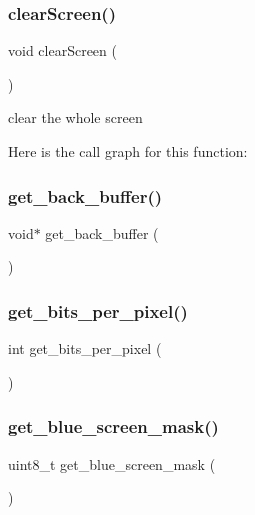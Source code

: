 \subsubsection{\texorpdfstring{clearScreen()}{clearScreen()}}
{\footnotesize\ttfamily void clear\+Screen (\begin{DoxyParamCaption}{ }\end{DoxyParamCaption})}



clear the whole screen 

Here is the call graph for this function\+:
\mbox{\label{group__video_gabf77be88afd0e4b1165719c50c8896ba}} 
\subsubsection{\texorpdfstring{get\_back\_buffer()}{get\_back\_buffer()}}
{\footnotesize\ttfamily void$\ast$ get\+\_\+back\+\_\+buffer (\begin{DoxyParamCaption}{ }\end{DoxyParamCaption})}

\mbox{\label{group__video_ga93c2bd40f276f3ac190868b704a0b460}} 
\subsubsection{\texorpdfstring{get\_bits\_per\_pixel()}{get\_bits\_per\_pixel()}}
{\footnotesize\ttfamily int get\+\_\+bits\+\_\+per\+\_\+pixel (\begin{DoxyParamCaption}{ }\end{DoxyParamCaption})}

\mbox{\label{group__video_ga6929228fd26ebbf17efe05d9a72658a7}} 
\subsubsection{\texorpdfstring{get\_blue\_screen\_mask()}{get\_blue\_screen\_mask()}}
{\footnotesize\ttfamily uint8\+\_\+t get\+\_\+blue\+\_\+screen\+\_\+mask (\begin{DoxyParamCaption}{ }\end{DoxyParamCaption})}

